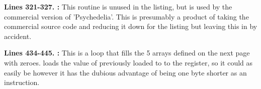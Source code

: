 \bigskip
\bigskip
\bigskip
\bigskip
\bigskip
\bigskip
\bigskip
\bigskip
\bigskip
\bigskip
\bigskip
\bigskip
\textbf{Lines 321-327. :} This routine is unused in the listing, but is used by the commercial version of 'Psychedelia'. This is
presumably a product of taking the commercial source code and reducing it down for the listing but 
leaving this in by accident.

\bigskip
\bigskip
\bigskip
\bigskip
\textbf{Lines 434-445. :} This is a loop that fills the 5 arrays defined on the next page with zeroes.
 loads the value of  previously loaded to  to the  register, so it could as easily be 
however it has the dubious advantage of being one byte shorter as an instruction.

